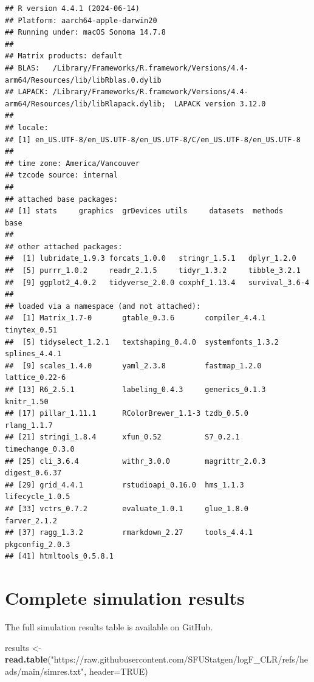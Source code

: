 \documentclass[
]{article}
\newenvironment{Shaded}{\begin{snugshade}}{\end{snugshade}}
\newcommand{\AttributeTok}[1]{\textcolor[rgb]{0.13,0.29,0.53}{#1}}
\newcommand{\ConstantTok}[1]{\textcolor[rgb]{0.56,0.35,0.01}{#1}}
\newcommand{\FunctionTok}[1]{\textcolor[rgb]{0.13,0.29,0.53}{\textbf{#1}}}
\newcommand{\NormalTok}[1]{#1}
\newcommand{\OtherTok}[1]{\textcolor[rgb]{0.56,0.35,0.01}{#1}}
\newcommand{\StringTok}[1]{\textcolor[rgb]{0.31,0.60,0.02}{#1}}
\begin{document}
\begin{verbatim}
## R version 4.4.1 (2024-06-14)
## Platform: aarch64-apple-darwin20
## Running under: macOS Sonoma 14.7.8
## 
## Matrix products: default
## BLAS:   /Library/Frameworks/R.framework/Versions/4.4-arm64/Resources/lib/libRblas.0.dylib 
## LAPACK: /Library/Frameworks/R.framework/Versions/4.4-arm64/Resources/lib/libRlapack.dylib;  LAPACK version 3.12.0
## 
## locale:
## [1] en_US.UTF-8/en_US.UTF-8/en_US.UTF-8/C/en_US.UTF-8/en_US.UTF-8
## 
## time zone: America/Vancouver
## tzcode source: internal
## 
## attached base packages:
## [1] stats     graphics  grDevices utils     datasets  methods   base     
## 
## other attached packages:
##  [1] lubridate_1.9.3 forcats_1.0.0   stringr_1.5.1   dplyr_1.2.0    
##  [5] purrr_1.0.2     readr_2.1.5     tidyr_1.3.2     tibble_3.2.1   
##  [9] ggplot2_4.0.2   tidyverse_2.0.0 coxphf_1.13.4   survival_3.6-4 
## 
## loaded via a namespace (and not attached):
##  [1] Matrix_1.7-0       gtable_0.3.6       compiler_4.4.1     tinytex_0.51      
##  [5] tidyselect_1.2.1   textshaping_0.4.0  systemfonts_1.3.2  splines_4.4.1     
##  [9] scales_1.4.0       yaml_2.3.8         fastmap_1.2.0      lattice_0.22-6    
## [13] R6_2.5.1           labeling_0.4.3     generics_0.1.3     knitr_1.50        
## [17] pillar_1.11.1      RColorBrewer_1.1-3 tzdb_0.5.0         rlang_1.1.7       
## [21] stringi_1.8.4      xfun_0.52          S7_0.2.1           timechange_0.3.0  
## [25] cli_3.6.4          withr_3.0.0        magrittr_2.0.3     digest_0.6.37     
## [29] grid_4.4.1         rstudioapi_0.16.0  hms_1.1.3          lifecycle_1.0.5   
## [33] vctrs_0.7.2        evaluate_1.0.1     glue_1.8.0         farver_2.1.2      
## [37] ragg_1.3.2         rmarkdown_2.27     tools_4.4.1        pkgconfig_2.0.3   
## [41] htmltools_0.5.8.1
\end{verbatim}

\clearpage

\section{Complete simulation results}\label{complete-simulation-results}

The full simulation results table is available on GitHub.

\begin{Shaded}
\begin{Highlighting}[]
\NormalTok{results }\OtherTok{\textless{}{-}} \FunctionTok{read.table}\NormalTok{(}\StringTok{"https://raw.githubusercontent.com/SFUStatgen/logF\_CLR/refs/heads/main/simres.txt"}\NormalTok{,}
                      \AttributeTok{header=}\ConstantTok{TRUE}\NormalTok{)}
\end{Highlighting}
\end{Shaded}


\end{document}

